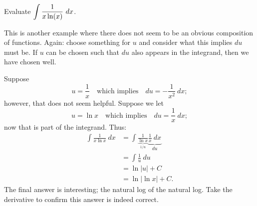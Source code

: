 \begin{example} \label{Ex:4.6.ussub4} %
Evaluate $\displaystyle \int \frac{1}{x \ln(x)} \ dx$.

\solution
This is another example where there does not seem to be an obvious composition of functions. Again: choose something for $u$ and consider what this implies $du$ must be. If $u$ can be chosen such that $du$ also appears in the integrand, then we have chosen well.

Suppose
\[ u = \frac{1}{x} \quad \mbox{which implies} \quad du = -\frac{1}{x^2} \ dx;\]
however, that does not seem helpful. Suppose we let
\[ u = \ln x \quad \mbox{which implies} \quad du = \frac{1}{x} \ dx;\]
now that is part of the integrand. Thus:
\begin{align*}
\int \frac1{x\ln x}\ dx 	&=	\int \frac{1}{\underbrace{\ln x}_{1/u}}\underbrace{\frac1x\ dx}_{du} \\
&= \int \frac1u\ du \\
&= \ln |u| + C \\
&= \ln | \ln x| + C.
\end{align*}
The final answer is interesting; the natural log of the natural log. Take the derivative to confirm this answer is indeed correct.
\end{example}